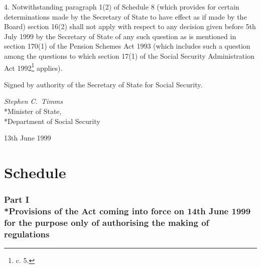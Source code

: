 \documentclass[12pt,a4paper]{article}
\begin{document}
4.  Notwithstanding paragraph 1(2) of Schedule 8 (which provides for certain determinations made by the Secretary of State to have effect as if made by the Board) section 16(2) shall not apply with respect to any decision given before 5th July 1999 by the Secretary of State of any such question as is mentioned in section 170(1) of the Pension Schemes Act 1993 (which includes such a question among the questions to which section 17(1) of the Social Security Administration Act 1992\footnote{ c. 5.} applies). 

\bigskip

Signed 
by authority of the Secretary of State for Social Security.

{\raggedleft
\emph{Stephen C.\ Timms
}\\*Minister of State,\\*Department of Social Security

}

13th June 1999

\small

\part{Schedule}

\section[Part I --- Provisions of the Act coming into force on 14th June 1999 for the purpose only of authorising the making of regulations]{Part I\\*Provisions of the Act coming into force on 14th June 1999 for the purpose only of authorising the making of regulations}

\renewcommand\parthead{--- Schedule Part I}
\end{document}
